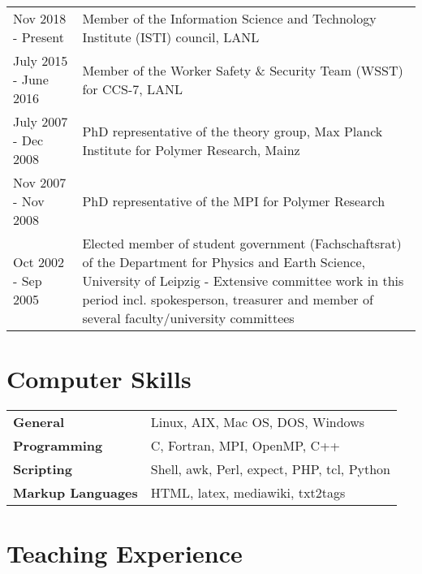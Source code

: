 \documentclass{article}
\begin{document}
\begin{tabular}{p{}p{}}
Nov 2018 - Present & Member of the Information Science and Technology Institute (ISTI) council, LANL \\ 
July 2015 - June 2016 & Member of the Worker Safety \& Security Team (WSST) for CCS-7, LANL \\
July 2007 - Dec 2008 & PhD representative of the theory group, Max Planck Institute for Polymer Research, Mainz \\
Nov 2007 - Nov 2008 & PhD representative of the MPI for Polymer Research \\
Oct 2002 - Sep 2005 & Elected member of student government (Fachschaftsrat) of the Department for Physics and Earth Science, University of Leipzig - Extensive committee work in this period incl. spokesperson, treasurer and member of several faculty/university committees \\
\end{tabular}


\section*{Computer Skills}

\begin{tabular}{ll}
\textbf{General} & Linux, AIX, Mac OS, DOS, Windows \\
\textbf{Programming} & C, Fortran, MPI, OpenMP, C++ \\
\textbf{Scripting} & Shell, awk, Perl, expect, PHP, tcl, Python\\
\textbf{Markup Languages} & HTML, latex, mediawiki, txt2tags \\
\end{tabular}

\section*{Teaching Experience}
\end{document}
